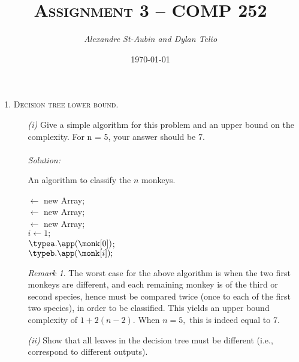 \documentclass[12pt]{article}
\title{\textsc{Assignment 3 -- COMP 252}}
\author{\it Alexandre St-Aubin and Dylan Telio}
\date{\today}
\theoremstyle{definition}
\theoremstyle{remark}
\newtheorem*{remark}{Remark}
\newcommand\sol{%
  \\ 
  \\
  \textit{Solution:}\\%
}
\begin{document}
\maketitle 
\begin{enumerate}
  \item \textsc{Decision tree lower bound.}
  \begin{enumerate}
    \item[\it (i)]Give a simple algorithm for this problem and an upper bound on the complexity. For n = 5, your answer should be 7.
    \sol
    \begin{algorithm}
    \caption{An algorithm to classify the $n$ monkeys. }
    \BlankLine
    \typea $\leftarrow$ new Array;  \\ 
    \typeb $\leftarrow$ new Array;  \\ 
    \typec $\leftarrow$ new Array;  \\ 
    $i \leftarrow 1;$\\ 
    $\typea.\app(\monk[0])$;\\
      $\typeb.\app (\monk[i]);$
    \BlankLine 
  \end{algorithm}
    \begin{remark} 
      The worst case for the above algorithm is when the two first monkeys are different, and each remaining monkey is of the third or second species, hence must be compared twice (once to each of the first two species), in order to be classified. This yields an upper bound complexity of $1 + 2(n-2).$ When $n = 5, $ this is indeed equal to 7.
    \end{remark} 
    \newpage
    \item[\it (ii)] Show that all leaves in the decision tree must be different (i.e., correspond to different outputs).

\end{enumerate}
\end{enumerate}
\end{document}
